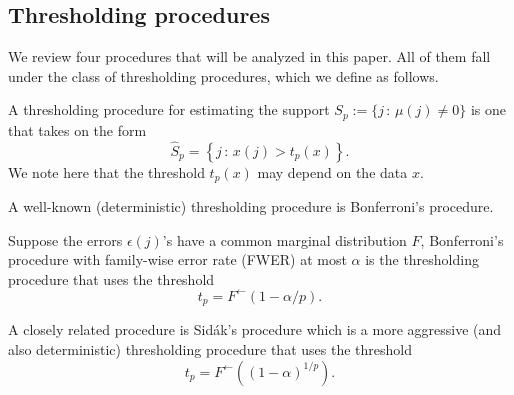 \subsection{Thresholding procedures} \label{subsec:thresholding-procedures}

We review four procedures that will be analyzed in this paper.
All of them fall under the class of thresholding procedures, which we define as follows.
\begin{definition}
A thresholding procedure for estimating the support 
$S_p:=\{j\, :\, \mu(j)\neq0\}$ is one that takes on the form
\begin{equation} \label{eq:thresholding-procedure}
    \widehat{S}_p = \left\{j\, :\, x(j) > t_p(x)\right\}.
\end{equation}
We note here that the threshold $t_p(x)$ may depend on the data $x$.
\end{definition}
A well-known (deterministic) thresholding procedure is Bonferroni's procedure.
\begin{definition}
Suppose the errors $\epsilon(j)$'s have a common marginal distribution $F$, Bonferroni's procedure with family-wise error rate (FWER) at most $\alpha$ is the thresholding procedure that uses the threshold
\begin{equation} \label{eq:Bonferroni-procedure}
    t_p = F^{\leftarrow}(1 - \alpha/p).
\end{equation}
\end{definition}
A closely related procedure is Sid\'ak's procedure \citep{vsidak1967rectangular}
which is a more aggressive (and also deterministic) thresholding procedure that uses the 
threshold
\begin{equation} \label{eq:Sidak-procedure}
    t_p = F^{\leftarrow}((1 - \alpha)^{1/p}).
\end{equation}

